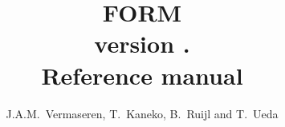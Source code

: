 \documentclass[11pt]{report}
\newcommand{\emptypage}{\newpage \thispagestyle{empty} \tiny{\ } \normalsize}
\newcommand{\clearemptydoublepage}{\newpage{\pagestyle{empty}\cleardoublepage}}
\begin{document}
\begin{titlepage}
\title{\Huge FORM \\ \Large version \formmajorversion.\formminorversion \\
  \huge Reference manual}
\date{\formdate}
\author{J.A.M.~Vermaseren, T.~Kaneko, B.~Ruijl and T.~Ueda}
\end{titlepage}
\maketitle

\setcounter{page}{2}
\clearemptydoublepage
\emptypage
\clearemptydoublepage
{}
\setcounter{page}{1}
\clearemptydoublepage
\tableofcontents
\clearemptydoublepage
\emptypage
\clearemptydoublepage
{}
\setcounter{page}{1}
%






















%
\printindex
\end{document}
